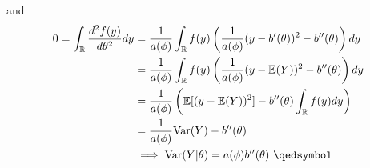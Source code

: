 and 
\begin{equation}
    \begin{aligned}
    0 = \int_{\mathbb{R}} \frac{d^2 f(y)}{d\theta^2} dy &= \frac{1}{a(\phi)} \int_{\mathbb{R}} f(y) \left( \frac{1}{a(\phi)}(y-b'(\theta))^2 - b''(\theta) \right) dy \\
    &= \frac{1}{a(\phi)} \int_{\mathbb{R}} f(y) \left( \frac{1}{a(\phi)} (y-\mathbb{E}(Y))^2 - b''(\theta) \right) dy \\
    &= \frac{1}{ a(\phi)} \left( \mathbb{E}[(y-\mathbb{E}(Y))^2]- b''(\theta) \int_{\mathbb{R}} f(y)dy \right) \\
    & = \frac{1}{a(\phi)}\text{Var}(Y) - b''(\theta) \\
    & \implies \text{Var}(Y \lvert \theta) = a(\phi) b''(\theta) \ \qedsymbol
    \end{aligned}
\end{equation}